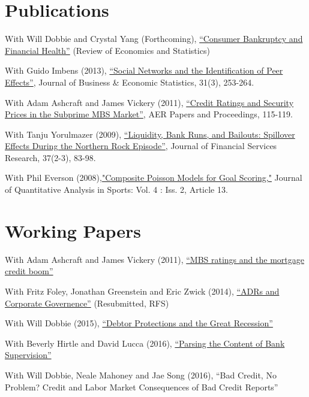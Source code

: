 \documentclass[letterpaper]{article}
\renewenvironment{itemize}{
  \begin{list}{}
    { \setlength{\itemsep}{5pt}
      \setlength{\parsep}{0pt}
      \setlength{\topsep}{0pt}
      \setlength{\leftmargin}{0em} } }{
  \end{list}}
\begin{document}
\section*{Publications}

\begin{itemize}
\item With Will Dobbie and Crystal Yang (Forthcoming),
  \href{http://www.nber.org/papers/w21032}{``Consumer Bankruptcy and
    Financial Health''} (Review of Economics and Statistics)
\item With Guido Imbens (2013), \href{http://www.tandfonline.com/doi/pdf/10.1080/07350015.2013.801251}{``Social Networks and the Identification of Peer Effects''}, Journal of Business \& Economic Statistics, 31(3), 253-264.
\item With Adam Ashcraft and James Vickery (2011), \href{http://papers.ssrn.com.ezp-prod1.hul.harvard.edu/sol3/papers.cfm?abstract_id=1856823}{``Credit Ratings
    and Security Prices in the Subprime MBS Market''}, AER Papers and Proceedings,  115-119. 
\item With Tanju Yorulmazer (2009), \href{http://www.springerlink.com/content/ww187761jgr660q5/}{``Liquidity, Bank Runs, and Bailouts: Spillover Effects During the Northern Rock Episode''}, Journal of Financial Services Research, 37(2-3), 83-98. 
\item With Phil Everson (2008),\href{http://www.bepress.com/jqas/vol4/iss2/13/}{"Composite Poisson Models for Goal Scoring,"} Journal of Quantitative Analysis in Sports: Vol. 4 : Iss. 2, Article 13.
\end{itemize}

\section*{Working Papers}

\begin{itemize}
\item With Adam Ashcraft and James Vickery (2011), \href{http://papers.ssrn.com/sol3/papers.cfm?abstract_id=1615613}{``MBS ratings and
  the mortgage credit boom''}
\item With Fritz Foley, Jonathan Greenstein and Eric Zwick (2014), \href{http://www.nber.org/papers/w19953}{``ADRs and Corporate Governence''} (Resubmitted, RFS)
\item With Will Dobbie (2015), \href{https://paulgp.github.io/papers/Dobbie_GoldsmithPinkham_Jan092015.pdf}{``Debtor Protections and the Great Recession''}
\item With Beverly Hirtle and David Lucca (2016), \href{https://www.newyorkfed.org/research/staff_reports/sr770.html}{``Parsing the Content of Bank Supervision''}
\item With Will Dobbie, Neale Mahoney and Jae Song (2016), ``Bad Credit, No Problem? Credit and Labor Market Consequences of Bad Credit Reports''
\end{itemize}
\end{document}
